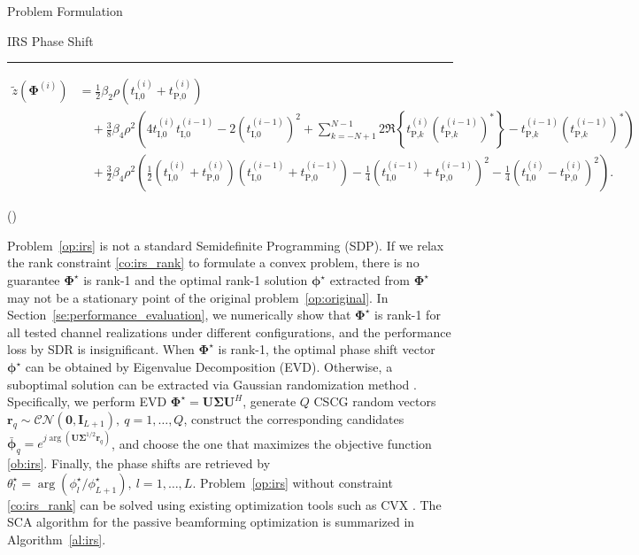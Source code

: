 \documentclass[journal]{IEEEtran}
\begin{document}
\begin{section}{Problem Formulation}
\begin{subsection}{IRS Phase Shift}
			\begin{figure*}[b]
				\hrule
				\begin{align}
					\tilde{z}(\boldsymbol{\Phi}^{(i)})
					& = \frac{1}{2}{\beta_2}{\rho}(t_{\text{I,}0}^{(i)}+t_{\text{P,}0}^{(i)})\nonumber\\
					& \quad + \frac{3}{8}{\beta_4}{\rho^2} \left(4 t_{\text{I,}0}^{(i)}t_{\text{I,}0}^{(i-1)} - 2 (t_{\text{I,}0}^{(i-1)})^2 + \sum_{k=-N+1}^{N-1}{2 \Re\left\{t_{\text{P,}k}^{(i)} (t_{\text{P,}k}^{(i-1)})^*\right\} - t_{\text{P,}k}^{(i-1)} (t_{\text{P,}k}^{(i-1)})^*}\right)\nonumber\\
					& \quad + \frac{3}{2}{\beta_4}{\rho^2} \left(\frac{1}{2}(t_{\text{I,}0}^{(i)} + t_{\text{P,}0}^{(i)})(t_{\text{I,}0}^{(i-1)} + t_{\text{P,}0}^{(i-1)}) - \frac{1}{4}(t_{\text{I,}0}^{(i-1)} + t_{\text{P,}0}^{(i-1)})^2 - \frac{1}{4}(t_{\text{I,}0}^{(i)} - t_{\text{P,}0}^{(i)})^2\right).\label{eq:z_irs_approx}
				\end{align}
			\end{figure*}
			\begin{maxi!}
				{\boldsymbol{\Phi}}{(\boldsymbol{\Phi})}{\label{op:irs}}{\label{ob:irs}}
				\label{co:irs_rate}
				\label{co:irs_modulus}
			\end{maxi!}
			Problem~\eqref{op:irs} is not a standard Semidefinite Programming (SDP). If we relax the rank constraint \eqref{co:irs_rank} to formulate a convex problem, there is no guarantee $\boldsymbol{\Phi}^{\star}$ is rank-\num{1} and the optimal rank-\num{1} solution $\boldsymbol{\phi}^{\star}$ extracted from $\boldsymbol{\Phi}^{\star}$ may not be a stationary point of the original problem~\eqref{op:original}. In Section~\ref{se:performance_evaluation}, we numerically show that $\boldsymbol{\Phi}^{\star}$ is rank-\num{1} for all tested channel realizations under different configurations, and the performance loss by SDR is insignificant. When $\boldsymbol{\Phi}^{\star}$ is rank-\num{1}, the optimal phase shift vector $\boldsymbol{\phi}^\star$ can be obtained by Eigenvalue Decomposition (EVD). Otherwise, a suboptimal solution can be extracted via Gaussian randomization method \cite{Huang2010}. Specifically, we perform EVD $\boldsymbol{\Phi}^{\star}=\boldsymbol{U}\boldsymbol{\Sigma}\boldsymbol{U}^H$, generate $Q$ CSCG random vectors $\boldsymbol{r}_q \sim \mathcal{CN}(\boldsymbol{0},\boldsymbol{I}_{L+1}),\ q=1,\dots,Q$, construct the corresponding candidates $\bar{\boldsymbol{\phi}}_q=e^{j\arg\left(\boldsymbol{U}\boldsymbol{\Sigma}^{1/2}\boldsymbol{r}_q\right)}$, and choose the one that maximizes the objective function \eqref{ob:irs}. Finally, the phase shifts are retrieved by $\theta_l^{\star}=\arg(\phi_l^\star/\phi_{L+1}^\star), \ l=1,\dots,L$. Problem~\eqref{op:irs} without constraint \eqref{co:irs_rank} can be solved using existing optimization tools such as CVX \cite{Grant2013}. The SCA algorithm for the passive beamforming optimization is summarized in Algorithm~\ref{al:irs}.

\end{subsection}
\end{section}
\end{document}
